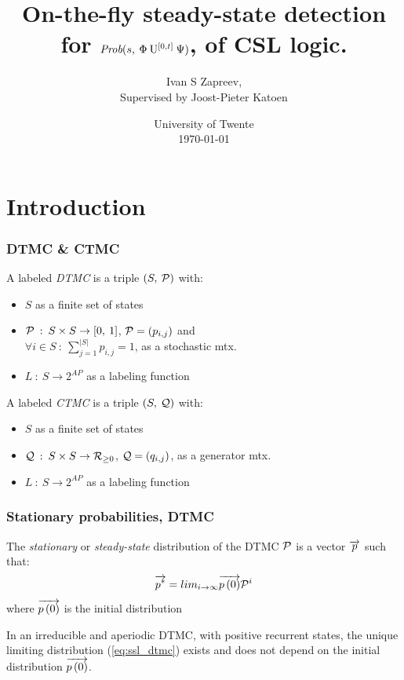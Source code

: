 \documentclass{beamer}
\title{On-the-fly steady-state detection for $\mbox{\it Prob}(s, \: \Phi \: \mathrm{U}^{[0,t]} \: \Psi )$, of CSL logic.}
\author{Ivan S Zapreev, \\ {\tiny Supervised by Joost-Pieter Katoen}}
\date{University of Twente \\ {\tiny \today}}
\begin{document}


\frame{\titlepage}

\section[Outline]{}
\frame{\tableofcontents}

\section{Introduction}	


\frame
{
	\frametitle{DTMC \& CTMC}
	\begin{definition}
		A labeled \emph{DTMC} is a triple $\left( S,\: \mathcal{P} \right)$ with:
	      \begin{itemize}
	      		\item $S$ as a finite set of states
			\item $\mathcal{P} \: : \: S \times S \rightarrow \left[0,\:1 \right]$, $\mathcal{P}=\left(p_{i,j}\right)$ and \\ $\forall i \in S \: : \: \sum_{j=1}^{|S|}  p_{i,j}=1$,  as a stochastic mtx.
			\item  $L \: : \: S \rightarrow 2^{AP}$ as a labeling function
		\end{itemize}
	\end{definition}
	\begin{definition}
		A labeled \emph{CTMC} is a triple $\left( S,\: \mathcal{Q} \right)$ with:
		\begin{itemize}
			\item $S$ as a finite set of states
			\item $\mathcal{Q} \: : \: S \times S \rightarrow \mathcal{R}_{\geq 0}$, $\mathcal{Q}=\left(q_{i,j}\right)$,  as a generator mtx.
			\item $L \: : \: S \rightarrow 2^{AP}$ as a labeling function
		\end{itemize}
	\end{definition}
}

\frame
{
	\frametitle{Stationary probabilities, DTMC \cite{Haverkort_98}}
	\begin{definition}
		The \emph{stationary} or \emph{steady-state} distribution of the DTMC $\mathcal{P}$ is a vector $\overrightarrow{p}$ such that:
		\begin{equation}
			\overrightarrow{p^{*}} = lim_{i \to \infty} \overrightarrow{p \left( 0 \right)} \mathcal{P}^{i}
			\label{eq:ssl_dtmc}
		\end{equation}
		where $\overrightarrow{p \left( 0 \right)}$ is the initial distribution
	\end{definition}
	\begin{theorem}
		In an irreducible and aperiodic DTMC, with positive recurrent states, the unique limiting distribution (\ref{eq:ssl_dtmc}) exists and does not depend on the initial distribution $\overrightarrow{p \left( 0 \right)}$.
	\end{theorem}
}
\end{document}
